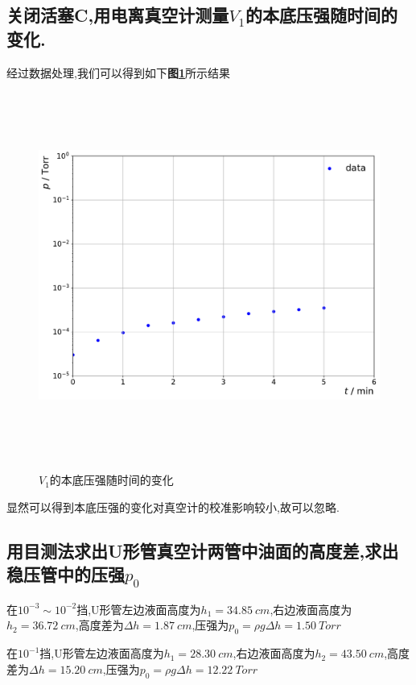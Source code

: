 \documentclass[a4paper]{article}
\begin{document}
\subsection{关闭活塞C,用电离真空计测量$V_1$的本底压强随时间的变化.}\label{sub:1}
经过数据处理,我们可以得到如下\textbf{图\ref{fig:fig3}}所示结果 
\begin{figure}[H]
 \centering
 \caption{$V_1$的本底压强随时间的变化}
 \includegraphics[height=12cm, width=16cm]{images/phyex1_fig1.pdf}
 \label{fig:fig3}
\end{figure}
显然可以得到本底压强的变化对真空计的校准影响较小,故可以忽略.\\

\subsection{用目测法求出U形管真空计两管中油面的高度差,求出稳压管中的压强$p_0$}\label{sub:2}
在$10^{-3}\sim10^{-2}$挡,U形管左边液面高度为$h_1=\SI{34.85}{cm}$,右边液面高度为$h_2=\SI{36.72}{cm}$,高度差为$\Delta h=\SI{1.87}{cm}$,压强为$p_0=\rho g\Delta h=\SI{1.50}{Torr}$

在$10^{-1}$挡,U形管左边液面高度为$h_1=\SI{28.30}{cm}$,右边液面高度为$h_2=\SI{43.50}{cm}$,高度差为$\Delta h=\SI{15.20}{cm}$,压强为$p_0=\rho g\Delta h=\SI{12.22}{Torr}$
\end{document}
